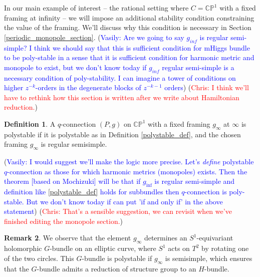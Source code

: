 \documentclass[11pt, oneside, reqno]{amsart}
\theoremstyle{definition} \newtheorem{definition}{Definition}[section]
\theoremstyle{definition} \newtheorem{remark}[definition]{Remark}
\theoremstyle{definition} \newtheorem{remarks}[definition]{Remarks}
\theoremstyle{definition} \newtheorem{question}[definition]{Question}
\theoremstyle{definition} \newtheorem*{note}{Note}
\theoremstyle{definition} \newtheorem{example}[definition]{Example}
\theoremstyle{definition} \newtheorem{examples}[definition]{Examples}
\newcommand{\bb}[1]{\mathbb{#1}}
\newcommand{\chris}[1]{(\textcolor{red}{Chris: #1})}
\newcommand{\vasily}[1]{(\textcolor{blue}{Vasily: #1})}
\begin{document}
In our main example of interest -- the rational setting where $C = \bb{CP}^1$ with a fixed framing at infinity -- we will impose an additional stability condition constraining the value of the framing.  We'll discuss why this condition is necessary in Section \ref{periodic_monopole_section}.
\vasily{Are we going to say $g_{inf}$ is regular semi-simple? I think
  we should say that this is sufficient condition for mHiggs bundle
  to be poly-stable in a sense that it is sufficient condition
  for harmonic metric and monopole to exist, but we don't know
  today if $g_{inf}$ regular semi-simple is a necessary condition
  of poly-stability. I can imagine a tower of conditions on higher $z^{-k}$-orders
in the degenerate blocks of $z^{-{k-1}}$ orders} \chris{I think we'll have to rethink how this section is written after we write about Hamiltonian reduction.}


\begin{definition} \label{rational_stability_def}
A $q$-connection $(P,g)$ on $\bb{CP}^1$ with a fixed framing $g_\infty$ at $\infty$ is polystable if it is polystable as in Definition \ref{polystable_def}, and the chosen framing $g_\infty$ is regular semisimple.
\end{definition}

\vasily{I would suggest we'll make the logic more precise. Let's \emph{define}
  polystable $q$-connection as those for which harmonic metrics (monopoles) exists. Then the theorem [based on Mochizuki] will be that if  $g_{\inf}$ is regular semi-simple and definition like \ref{polystable_def} holds for subbundles then $q$-connection is poly-stable. But we don't know today if can put 'if and only if' in the above statement} \chris{That's a sensible suggestion, we can revisit when we've finished editing the monopole section.}
\begin{remark}
We observe that the element $g_\infty$ determines an $S^1$-equivariant holomorphic $G$-bundle on an elliptic curve, where $S^1$ acts on $T^2$ by rotating one of the two circles.  This $G$-bundle is polystable if $g_\infty$ is semisimple, which ensures that the $G$-bundle admits a reduction of structure group to an $H$-bundle.
\end{remark}
\end{document}
